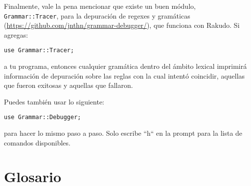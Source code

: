Finalmente, vale la pena mencionar que existe un buen módulo, \verb|Grammar::Tracer|, 
para la depuración de regexes y gramáticas (\url{https://github.com/jnthn/grammar-debugger/}), 
que funciona con Rakudo. Si agregas:

\begin{verbatim}
use Grammar::Tracer;
\end{verbatim}

a tu programa, entonces cualquier gramática dentro del ámbito lexical
imprimirá información de depuración sobre las reglas con la cual
intentó coincidir, aquellas que fueron exitosas y aquellas que 
fallaron.

Puedes también usar lo siguiente:

\begin{verbatim}
use Grammar::Debugger;
\end{verbatim}

para hacer lo mismo paso a paso. Solo escribe ``h`` en la 
prompt para la lista de comandos disponibles.


\section{Glosario}

